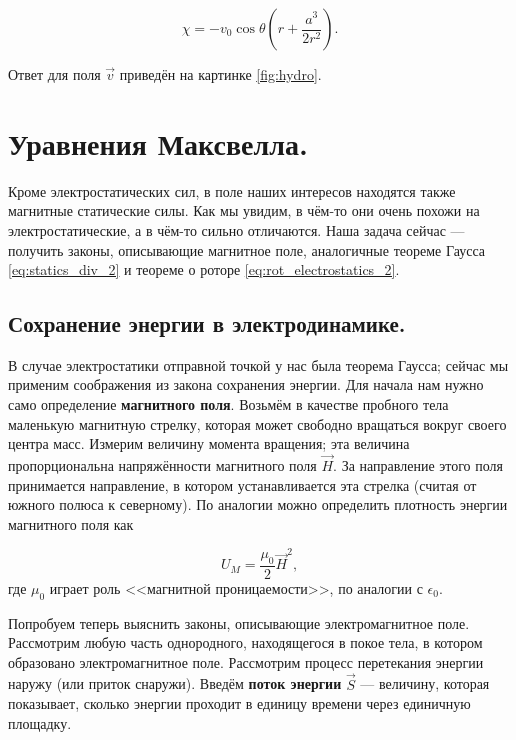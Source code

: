 \documentclass[11pt,a4paper]{article}
\numberwithin{equation}{section}
\newcommand{\eps}{\epsilon}
\begin{document}
\begin{equation}
  \label{eq:hydro_8}
  \chi = - v_0 \cos \theta \left(r + \frac{a^3}{2r^2} \right).
\end{equation}

Ответ для поля $\vec{v}$ приведён на картинке \ref{fig:hydro}.

\section{Уравнения Максвелла.}
\label{sec:maxwell}

Кроме электростатических сил, в поле наших интересов находятся также
магнитные статические силы. Как мы увидим, в чём-то они очень похожи
на электростатические, а в чём-то сильно отличаются. Наша задача
сейчас --- получить законы, описывающие магнитное поле, аналогичные
теореме Гаусса \eqref{eq:statics_div_2} и теореме о роторе
\eqref{eq:rot_electrostatics_2}. 

\subsection{Сохранение энергии в электродинамике.}
\label{sec:conservation_energy}

В случае электростатики отправной точкой у нас была теорема Гаусса;
сейчас мы применим соображения из закона сохранения энергии. Для
начала нам нужно само определение \textbf{магнитного поля}. Возьмём в
качестве пробного тела маленькую магнитную стрелку, которая может
свободно вращаться вокруг своего центра масс. Измерим величину момента
вращения; эта величина пропорциональна напряжённости магнитного поля
$\vec{H}$. За направление этого поля принимается направление, в
котором устанавливается эта стрелка (считая от южного полюса к
северному). По аналогии можно определить плотность энергии магнитного
поля как

\begin{equation}
  \label{eq:def_magnetic_energy}
  U_M = \frac{\mu_0}{2} \vec{H}^2,
\end{equation}
где $\mu_0$ играет роль <<магнитной проницаемости>>, по аналогии с
$\eps_0$. 

Попробуем теперь выяснить законы, описывающие электромагнитное
поле. Рассмотрим любую часть однородного, находящегося в покое тела, в
котором образовано электромагнитное поле. Рассмотрим процесс
перетекания энергии наружу (или приток снаружи). Введём \textbf{поток
  энергии} $\vec{S}$ --- величину, которая показывает, сколько энергии
проходит в единицу времени через единичную площадку.
\end{document}
